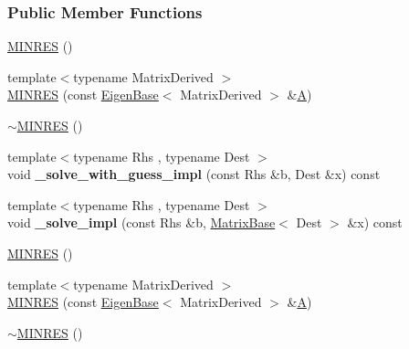 \subsubsection*{Public Member Functions}
\begin{DoxyCompactItemize}
\item 
\hyperlink{group___iterative_linear_solvers___module_aa519021be1178a99f5f9ec633de9fc09}{M\+I\+N\+R\+ES} ()
\item 
{\footnotesize template$<$typename Matrix\+Derived $>$ }\\\hyperlink{group___iterative_linear_solvers___module_a971bc758d11d1795d9e0abd3c958030b}{M\+I\+N\+R\+ES} (const \hyperlink{group___core___module_struct_eigen_1_1_eigen_base}{Eigen\+Base}$<$ Matrix\+Derived $>$ \&\hyperlink{group___core___module_class_eigen_1_1_matrix}{A})
\item 
\hyperlink{group___iterative_linear_solvers___module_a3f40ba58caac8b10ae7df474af93a05b}{$\sim$\+M\+I\+N\+R\+ES} ()
\item 
\mbox{\label{group___iterative_linear_solvers___module_a814e31f6e378b394d6627a5b19726f48}} 
{\footnotesize template$<$typename Rhs , typename Dest $>$ }\\void {\bfseries \+\_\+solve\+\_\+with\+\_\+guess\+\_\+impl} (const Rhs \&b, Dest \&x) const
\item 
\mbox{\label{group___iterative_linear_solvers___module_ad67efceb46c9833510956948f6d8980d}} 
{\footnotesize template$<$typename Rhs , typename Dest $>$ }\\void {\bfseries \+\_\+solve\+\_\+impl} (const Rhs \&b, \hyperlink{group___core___module_class_eigen_1_1_matrix_base}{Matrix\+Base}$<$ Dest $>$ \&x) const
\item 
\hyperlink{group___iterative_linear_solvers___module_aa519021be1178a99f5f9ec633de9fc09}{M\+I\+N\+R\+ES} ()
\item 
{\footnotesize template$<$typename Matrix\+Derived $>$ }\\\hyperlink{group___iterative_linear_solvers___module_a971bc758d11d1795d9e0abd3c958030b}{M\+I\+N\+R\+ES} (const \hyperlink{group___core___module_struct_eigen_1_1_eigen_base}{Eigen\+Base}$<$ Matrix\+Derived $>$ \&\hyperlink{group___core___module_class_eigen_1_1_matrix}{A})
\item 
\hyperlink{group___iterative_linear_solvers___module_a3f40ba58caac8b10ae7df474af93a05b}{$\sim$\+M\+I\+N\+R\+ES} ()

\end{DoxyCompactItemize}
